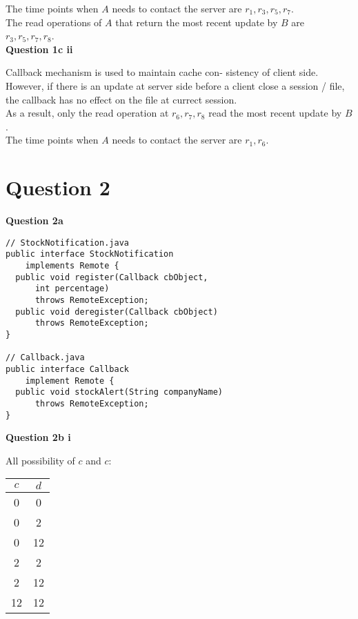 \documentclass[11pt,a4paper]{report}
\begin{document}
\begin{multicols*}{2}
\noindent The time points when $A$ needs to contact the server are $r_1,r_3,r_5,r_7$.\\

\noindent The read operations of $A$ that return the most recent update by $B$ are $r_3,r_5,r_7,r_8$. \\

\noindent \textbf{Question 1c ii}

\noindent Callback mechanism is used to maintain cache con- sistency of client side. However, if there is an update at server side before a client close a session / file, the callback has no effect on the file at currect session. \\

\noindent As a result, only the read operation at $r_6,r_7,r_8$ read the most recent update by $B$. \\

\noindent The time points when $A$ needs to contact the server are $r_1,r_6$.\\

\section{Question 2}

\noindent \textbf{Question 2a}

\begin{verbatim}
// StockNotification.java
public interface StockNotification 
    implements Remote {
  public void register(Callback cbObject, 
      int percentage) 
      throws RemoteException;
  public void deregister(Callback cbObject) 
      throws RemoteException;
}

// Callback.java
public interface Callback 
    implement Remote {
  public void stockAlert(String companyName) 
      throws RemoteException;
}
\end{verbatim}

\noindent \textbf{Question 2b i}

\noindent All possibility of $c$ and $c$:

\begin{center}
\begin{tabular}{|c|c|}
  \hline
  $c$ & $d$ \\
  \hline
  0  & 0  \\
  0  & 2  \\
  0  & 12 \\
  2  & 2  \\
  2  & 12 \\
  12 & 12 \\ \hline
\end{tabular}
\end{center}


\end{multicols*}
\end{document}
